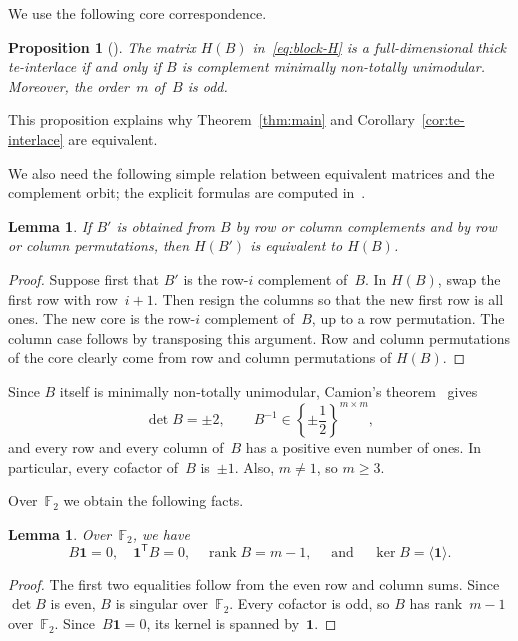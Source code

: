 \documentclass{amsart}
\newtheorem{lemma}[theorem]{Lemma}
\newtheorem{proposition}[theorem]{Proposition}
\numberwithin{equation}{section}
\newcommand{\F}{\mathbb F}
\newcommand{\one}{\mathbf 1}
\newcommand{\sfT}{\mathsf T}
\newcommand{\wideand}{ \quad \text{ and } \quad }
\DeclareMathOperator{\rank}{rank}
\begin{document}
We use the following core correspondence.

\begin{proposition}[{\cite[Corollary~3.35 and Theorem~3.26]{Chervet_Grappe_Vallee_2026}}]\label{prop:core}
    The matrix $H(B)$ in~\eqref{eq:block-H} is a full-dimensional thick te-interlace if and only if $B$ is complement minimally non-totally unimodular.
    Moreover, the order~$m$ of~$B$ is odd.
\end{proposition}
This proposition explains why Theorem~\ref{thm:main} and Corollary~\ref{cor:te-interlace} are equivalent.

We also need the following simple relation between equivalent matrices and the complement orbit; the explicit formulas are computed in~\cite[Lemma~3.32]{Chervet_Grappe_Vallee_2026}.

\begin{lemma}\label{lem:core-equivalence}
    If $B'$ is obtained from $B$ by row or column complements and by row or column permutations, then $H(B')$ is equivalent to $H(B)$.
\end{lemma}
\begin{proof}
    Suppose first that $B'$ is the row-$i$ complement of~$B$.
    In $H(B)$, swap the first row with row~$i+1$.
    Then resign the columns so that the new first row is all ones.
    The new core is the row-$i$ complement of~$B$, up to a row permutation.
    The column case follows by transposing this argument.
    Row and column permutations of the core clearly come from row and column permutations of $H(B)$.
\end{proof}

Since $B$ itself is minimally non-totally unimodular, Camion's theorem~\cite{Camion1965} gives
\begin{equation}\label{eq:camion}
    \det B=\pm2, \qquad B^{-1}\in\left\{\pm\frac12\right\}^{m\times m},
\end{equation}
and every row and every column of~$B$ has a positive even number of ones.
In particular, every cofactor of~$B$ is~$\pm1$.
Also, $m\neq1$, so $m\geq3$.

Over~$\F_2$ we obtain the following facts.
\begin{lemma}\label{lem:mod2-B}
    Over~$\F_2$, we have
    $$
        B\one=0, \quad \one^{\sfT}B=0, \quad \rank B=m-1, \wideand \ker B=\langle\one\rangle.
    $$
\end{lemma}
\begin{proof}
    The first two equalities follow from the even row and column sums.
    Since~$\det B$ is even, $B$ is singular over~$\F_2$.
    Every cofactor is odd, so $B$ has rank~$m-1$ over~$\F_2$.
    Since~$B\one=0$, its kernel is spanned by~$\one$.
\end{proof}
\end{document}
